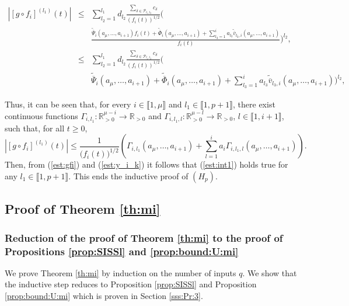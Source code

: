 \documentclass[letterpaper, 10pt]{article}
\newcommand{\rref}[1]{(\ref{#1})}
\newcommand{\abs}[1]{\left| #1 \right|}
\newcommand{\reels}{\mathbb{R}}
\newcommand{\pcal}{\mathcal{P}}
\begin{document}
\begin{eqnarray*}
\abs{[g \circ f_i]^{(l_1)}(t)} & \leq & \sum\limits_{l_2=1}^{l_1 } d_{l_2} \frac{\sum\limits_{\delta \in \pcal_{l_1 ,l_2}} c_\delta   }{( f_i(t) )^{1/2 }} \Bigg(  \\
 & &  
\frac{ \tilde{\overline{\Psi}}_{i}(a_\mu , \ldots , a_{i +1}) f_{i}(t)+ \tilde{\overline{\Phi}}_{i}(a_\mu , \ldots , a_{i +1})  +  \sum\limits_{l_3  =1}^{i}  a_{l_3} \tilde{\overline{v}}_{l_3,i} (a_\mu , \ldots , a_{i +1})  }{f_{i}(t) }  \Bigg)^{l_2}, \\
& \leq & \sum\limits_{l_2=1}^{l_1 } d_{l_2} \frac{\sum\limits_{\delta \in \pcal_{l_1 ,l_2}} c_\delta   }{( f_i(t) )^{1/2 }} \Bigg(  \\
 & &  
 \tilde{\overline{\Psi}}_{i}(a_\mu , \ldots , a_{i +1}) + \tilde{\overline{\Phi}}_{i}(a_\mu , \ldots , a_{i +1})  +  \sum\limits_{l_3  =1}^{i}  a_{l_3} \tilde{\overline{v}}_{l_3,i} (a_\mu , \ldots , a_{i +1}) \Bigg)^{l_2}, 
\end{eqnarray*}

Thus, it can be seen that, for every $i \in \llbracket 1 , \mu \rrbracket$ and $l_1 \in \llbracket 1, p+1 \rrbracket$, there exist continuous functions $\Gamma_{i,l_1} : \reels_{>0}^{\mu -i} \rightarrow \reels_{>0} $ and $\Gamma_{i,l_1,l} :  \reels_{>0}^{\mu -l} \rightarrow \reels_{>0} $, $l \in \llbracket 1 , i+1  \rrbracket$, such that, for all $t \geq 0$,
\begin{equation}
\label{est:gfi}
\abs{[g \circ f_i]^{(l_1)}(t)}  \leq \frac{1 }{\big( f_i(t) \big)^{ 1/2 }} \left( \Gamma_{i,l_1}(a_\mu , \ldots , a_{i+1} ) + \sum\limits_{l=1}^{i} a_i \Gamma_{i,l_1,l}(a_\mu , \ldots, a_{i+1})\right).
\end{equation}
Then, from \rref{est:gfi} and \rref{est:y_i_k} it follows that \rref{est:int1} holds true for any $l_1 \in \llbracket 1, p+1 \rrbracket$. This ends the inductive proof of $(H_p)$.
\subsection{Proof of Theorem \ref{th:mi}}
\subsubsection{Reduction of the proof of Theorem \ref{th:mi} to the proof of Propositions \ref{prop:SISSl} and \ref{prop:bound:U:mi}}\label{sec:red:th2}
We prove Theorem \ref{th:mi} by induction on the number of inputs $q$. We show that the inductive step reduces to Proposition \ref{prop:SISSl} and Proposition \ref{prop:bound:U:mi} which is proven in Section \ref{sss:Pr:3}.
\end{document}
